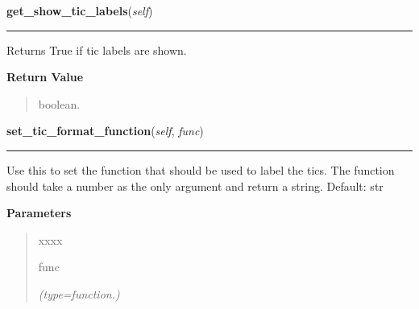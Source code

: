     \label{pygtk_chart:line_chart:Axis:get_show_tic_labels}

    \vspace{0.5ex}

\hspace{.8\funcindent}\begin{boxedminipage}{\funcwidth}

    \raggedright \textbf{get\_show\_tic\_labels}(\textit{self})

    \vspace{-1.5ex}

    \rule{\textwidth}{0.5\fboxrule}
\setlength{\parskip}{2ex}
    Returns True if tic labels are shown.

\setlength{\parskip}{1ex}
      \textbf{Return Value}
    \vspace{-1ex}

      \begin{quote}
      boolean.

      \end{quote}

    \end{boxedminipage}

    \label{pygtk_chart:line_chart:Axis:set_tic_format_function}

    \vspace{0.5ex}

\hspace{.8\funcindent}\begin{boxedminipage}{\funcwidth}

    \raggedright \textbf{set\_tic\_format\_function}(\textit{self}, \textit{func})

    \vspace{-1.5ex}

    \rule{\textwidth}{0.5\fboxrule}
\setlength{\parskip}{2ex}
    Use this to set the function that should be used to label the tics. The
    function should take a number as the only argument and return a string.
    Default: str

\setlength{\parskip}{1ex}
      \textbf{Parameters}
      \vspace{-1ex}

      \begin{quote}
        \begin{Ventry}{xxxx}

          \item[func]

            {\it (type=function.)}

        \end{Ventry}

      \end{quote}

    \end{boxedminipage}

